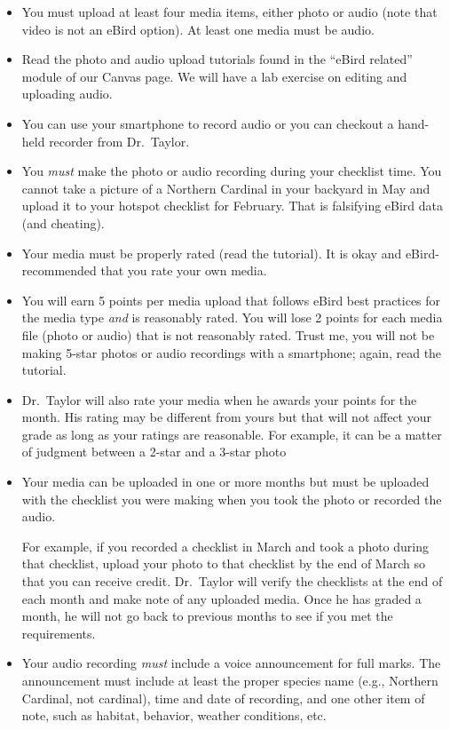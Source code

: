 \documentclass[12pt]{article}
\begin{document}
\begin{itemize}
\item You must upload at least four media items, either photo or audio (note that video is not an eBird option). At least one media must be audio.

\item Read the photo and audio upload tutorials found in the “eBird related” module of our Canvas page. We will have a lab exercise on editing and uploading audio. 

\item You can use your smartphone to record audio or you can checkout a hand-held recorder from Dr.~Taylor.

\item You \emph{must} make the photo or audio recording during your checklist time. You cannot take a picture of a Northern Cardinal in your backyard in May and upload it to your hotspot checklist for February. That is falsifying eBird data (and cheating).

\item Your media must be properly rated (read the tutorial). It is okay and eBird-recommended that you rate your own media. 

\item You will earn 5 points per media upload that follows eBird best practices for the media type \emph{and} is reasonably rated. You will lose 2 points for each media file (photo or audio) that is not reasonably rated. Trust me, you will not be making 5-star photos or audio recordings with a smartphone; again, read the tutorial.

\item Dr.~Taylor will also rate your media when he awards your points for the month. His rating may be different from yours but that will not affect your grade as long as your ratings are reasonable. For example, it can be a matter of judgment between a 2-star and a 3-star photo

\item Your media can be uploaded in one or more months but must be uploaded with the checklist you were making when you took the photo or recorded the audio. 

For example, if you recorded a checklist in March and took a photo during that checklist, upload your photo to that checklist by the end of March so that you can receive credit. Dr.~Taylor will verify the checklists at the end of each month and make note of any uploaded media. Once he has graded a month, he will not go back to previous months to see if you met the requirements.

\item Your audio recording \emph{must} include a voice announcement for full marks. The announcement must include at least the proper species name (e.g., Northern Cardinal, not cardinal), time and date of recording, and one other item of note, such as habitat, behavior, weather conditions, etc.


\end{itemize}
\end{document}
